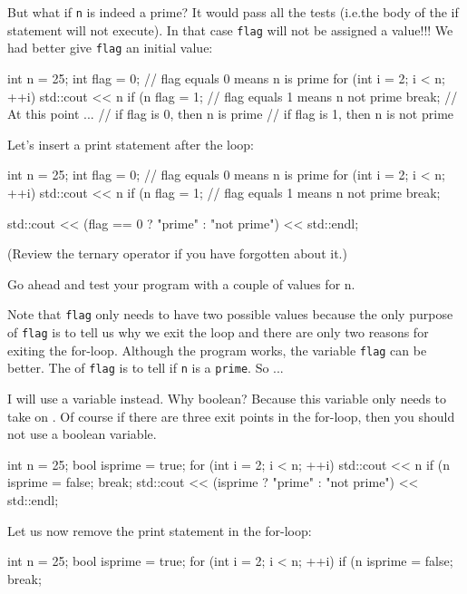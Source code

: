 \begin{console}
\begin{console}
But what if \texttt{n} is indeed a prime? It would pass all the tests
(i.e.the body of the if statement will not execute). In that case
\texttt{flag} will not be assigned a value!!! We had better give
\texttt{flag} an initial value:
\begin{console}
int n = 25;
int flag = 0; // flag equals 0 means n is prime
for (int i = 2; i < n; ++i)
{   
    std::cout << n %
    if (n %
    {
        flag = 1; // flag equals 1 means n not prime
        break;
    }
}
// At this point ...
// if flag is 0, then n is prime
// if flag is 1, then n is not prime \\
\end{console}
Let's insert a print statement after the loop:
\begin{console}
int n = 25;
int flag = 0; // flag equals 0 means n is prime
for (int i = 2; i < n; ++i)
{   
    std::cout << n %
    if (n %
    {
        flag = 1; // flag equals 1 means n not prime
        break;
    }
}

std::cout << (flag == 0 ? "prime" : "not prime")
          << std::endl;
\end{console}
(Review the ternary operator if you have forgotten about it.)

Go ahead and test your program with a couple of values for n.

Note that \texttt{flag} only needs to have two possible values because the
only purpose of \texttt{flag} is to tell us why we exit the loop and there
are only two reasons for exiting the for-loop. Although the program
works, the variable  \texttt{flag} can be better. The
 of \texttt{flag} is to tell if \texttt{n} is a
\texttt{prime}. So ...

I will use a \texttt{} variable \texttt{}
instead. Why boolean? Because this variable only needs to take on
. Of course if there are three exit points
in the for-loop, then you should not use a boolean variable.
\begin{console}
int n = 25;
bool isprime = true;
for (int i = 2; i < n; ++i)
{   
    std::cout << n %
    if (n %
    {  
        isprime = false;
        break;
    }
}
std::cout << (isprime ? "prime" : "not prime") << std::endl;
\end{console}
Let us now remove the print statement in the for-loop:
\begin{console}
int n = 25;
bool isprime = true;
for (int i = 2; i < n; ++i)
{   
    if (n %
    {
        isprime = false;
        break;
    }
}


\end{console}
\end{console}
\end{console}
